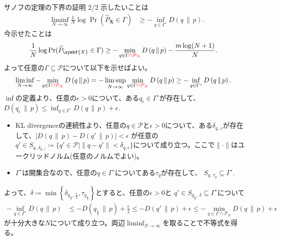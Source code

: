 \documentclass[lualatex,handout]{beamer}
\newcommand{\mycolor}[2]{%
  \begingroup
  \colorlet{currentcolor}{.}%
  \color{#1}#2%
  \color{currentcolor}%
  \endgroup
}
\newcommand{\emm}[1]{\mycolor{red}{#1}}
\newcommand\KL[2]{D\left(#1\,\|\,#2\right)}
\theoremstyle{definition}
\begin{document}
\begin{frame}{サノフの定理の下界の証明 2/2}
\scriptsize
示したいことは
\begin{align*}
\liminf_{N\to\infty}\frac1N\log\Pr(\widehat{P}_{\symbf{X}}\in\Gamma) &\ge -\inf_{q\in\Gamma^\circ}\KL{q}{p}.
\end{align*}
今示せたことは
\begin{align*}
\frac1N\log\Pr(\widehat{P}_{\symbf{X}}\in\Gamma) &\ge -\min_{q\in\Gamma\emm{\cap\mathcal{P}_N}}\KL{q}{p} - \frac{m\log(N+1)}{N}.
\end{align*}
よって任意の$\Gamma\subseteq\mathcal{P}$について以下を示せばよい。
\begin{align*}
 \liminf_{N\to\infty} -\min_{q\in\Gamma\emm{\cap\mathcal{P}_N}}\KL{q}{p} &=
 -\limsup_{N\to\infty} \min_{q\in\Gamma\emm{\cap\mathcal{P}_N}}\KL{q}{p} \ge -\inf_{q\in\Gamma^\circ}\KL{q}{p}.
\end{align*}
%
$\inf$の定義より、任意の$\epsilon>0$について、ある$q_{\epsilon}\in\Gamma^\circ$が存在して、$\KL{q_\epsilon}{p}\le\inf_{q\in\Gamma^\circ}\KL{q}{p}+\epsilon$.

\begin{itemize}
\item KL divergenceの連続性より、任意の$q\in\mathcal{P}$と$\epsilon>0$について、ある$\delta_{q,\,\epsilon}$が存在して、$|\KL{q}{p}-\KL{q'}{p}|<\epsilon$ が任意の$q'\in S_{q,\,\delta_{q,\,\epsilon}}\coloneq \{q'\in\mathcal{P}\mid \|q-q'\|<\delta_{q,\epsilon}\}$について成り立つ。ここで$\|\cdot\|$はユークリッドノルム(任意のノルムでよい)。
\item $\Gamma^\circ$は開集合なので、任意の$q\in\Gamma^\circ$についてある$\tau_{q}$が存在して、
$S_{q,\, \tau_q}\subseteq\Gamma^\circ$.
\end{itemize}
よって、$\delta\coloneq\min\left\{\delta_{q_{\frac{\epsilon}2},\, \frac{\epsilon}2}, \tau_{q_{\frac{\epsilon}2}}\right\}$とすると、任意の$\epsilon>0$と
$q'\in S_{q_{\frac{\epsilon}2},\, \delta}\subseteq \Gamma^\circ$について
\begin{align*}
-\inf_{q\in\Gamma^\circ} \KL{q}{p}
&\le -\KL{q_{\frac{\epsilon}2}}{p} + \frac{\epsilon}2
\le -\KL{q'}{p} + \epsilon
\le - \min_{q\in\Gamma\cap \mathcal{P}_N} \KL{q}{p} + \epsilon
\end{align*}
が十分大きな$N$について成り立つ。両辺$\liminf_{N\to\infty}$を取ることで不等式を得る。


\end{frame}
\end{document}
